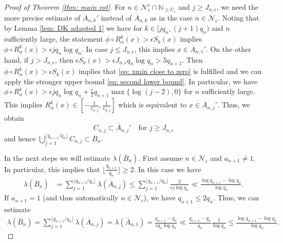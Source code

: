\documentclass[11pt]{amsart}
\theoremstyle{definition}
\numberwithin{equation}{section}
\begin{document}
\begin{proof}[Proof of Theorem \ref{thm: main rot}]
For $n\in \mathcal{N}_{\epsilon}^c\cap\mathbb{N}_{\geq U_\epsilon}$ and $j\geq J_{n,\epsilon}$, we need the more precise estimate of $\overline{A}_{n,k}'$ instead of $\overline{A}_{n,k}$ as in the case $n\in \mathcal{N}_{\epsilon}$. 
Noting that by Lemma \ref{lem: DK adapted 1}
we have for  $k\in [jq_n, (j+1)q_n)$ and $n$ sufficiently large, the statement $\phi\circ R_{\alpha}^k(x)>\epsilon S_k(x)$ implies 
 $\phi\circ R_{\alpha}^k(x)>\epsilon  jq_n\log q_n$. In case $j\leq J_{n,\epsilon}$, this implies $ x\in \overline{A}_{n,1}'$. On the other hand, if $j>J_{n,\epsilon}$, then $\epsilon S_k(x)> \epsilon J_{n,\epsilon}q_n\log q_n>5q_{n+1}$. Then $\phi\circ R_{\alpha}^k(x)> \epsilon S_k(x)$ implies that \eqref{eq: xmin close to zero} is fulfilled and we can apply the stronger upper bound \eqref{eq: second lower bound}.
 In particular, we have
$\phi\circ R_{\alpha}^k(x)>\epsilon  jq_n\log q_n+ \frac{\epsilon}{2} q_{n+1}\max\{\log(j-2), 0\}$ for $n$ sufficiently large.
This implies 
$R_{\alpha}^k(x)\in [-\frac{1}{v_{n,j}}, \frac{1}{v_{n,j}}]$ which is equivalent to
$ x\in \overline{A}_{n,j}'$. 
Thus, we obtain  
\begin{equation}
 C_{n,j}\subset \overline{A}_{n,j}'\quad\text{for }j\geq J_{n,\epsilon}\label{eq: C subset A'2}
\end{equation}
and hence
$\bigcup_{j=1}^{\lfloor q_{n+1}/q_n\rfloor} C_{n,j}\subset \overline{B}_n$.
\newline


In the next steps we will estimate $\lambda(\overline{B}_n)$. 
First assume $n\in\mathcal{N}_{\epsilon}$ and $a_{n+1}\neq 1$. In particular, this implies that $\lfloor \frac{q_{n+1}}{q_n}\rfloor \geq 2$. In this case we have 
\begin{align}
\lambda(\overline{B}_n)
 &=\sum_{j=1}^{\lfloor q_{n+1}/q_n\rfloor} \lambda(\overline{A}_{n,j})
 \leq\sum_{j=1}^{\lfloor q_{n+1}/q_n\rfloor}\frac{2}{\epsilon j \log q_n}
 \ll \frac{\log q_{n+1}-\log q_n}{\log q_n}.\label{eq: lambda upper B a}
\end{align}
If $a_{n+1}=1$ (and thus automatically $n\in\mathcal{N}_{\epsilon}$), we have $q_{n+1}\leq 2q_n$. Thus, we can estimate 
\begin{align}
 \lambda(\overline{B}_n)
 =\sum_{j=1}^{\lfloor q_{n+1}/q_n\rfloor} \lambda(\overline{A}_{n,j})
 =\lambda(\overline{A}_{n,1})
 =\frac{q_{n+1}-q_n}{\epsilon q_n\log q_n}
 \ll \frac{q_{n+1}-q_n}{q_{n}}\frac{1}{\log q_n}
 \leq \frac{\log q_{n+1}-\log q_n}{\log q_n}.\label{eq: lambda upper B a1}
\end{align}




\end{proof}
\end{document}

